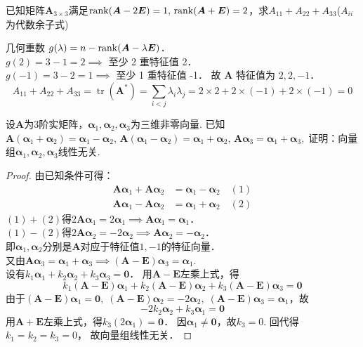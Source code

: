 \documentclass[12pt, a4paper, oneside, UTF8]{ctexbook}
\begin{document}
\begin{example}
    已知矩阵$\bm{A}_{3 \times 3}$满足$\mathrm{rank}(\bm{A}-2\bm{E})=1,\,\mathrm{rank}(\bm{A}+\bm{E})=2$，求$A_{11}+A_{22}+A_{33}$\;($A_{ii}$为代数余子式)
\end{example}
\begin{solution}
几何重数 $g(\lambda) = n - \mathrm{rank}(\bm{A}-\lambda\bm{E})$．\\
$g(2) = 3 - 1 = 2 \implies$ 至少 2 重特征值 2．\\
$g(-1) = 3 - 2 = 1 \implies$ 至少 1 重特征值 -1．
故 $\bm{A}$ 特征值为 $2, 2, -1$．
\[ A_{11}+A_{22}+A_{33} = \operatorname{tr}(\bm{A}^*) = \sum_{i<j} \lambda_i\lambda_j = 2\times 2 + 2\times(-1) + 2\times(-1) = 0 \]
\end{solution}

\begin{example}
    设$\bm{A}$为$3$阶实矩阵，$\bm{\alpha}_1,\bm{\alpha}_2,\bm{\alpha}_3$为三维非零向量. 已知$\bm{A}(\bm{\alpha}_1+\bm{\alpha}_2) = \bm{\alpha}_1-\bm{\alpha}_2,\, \bm{A}(\bm{\alpha}_1-\bm{\alpha}_2) = \bm{\alpha}_1+\bm{\alpha}_2,\, \bm{A}\bm{\alpha}_3 = \bm{\alpha}_1+\bm{\alpha}_3,\;$证明：向量组$\bm{\alpha}_1,\bm{\alpha}_2,\bm{\alpha}_3$线性无关.
\end{example}
\begin{proof}
    由已知条件可得：
    \begin{align*}
        \bm{A}\bm{\alpha}_1 + \bm{A}\bm{\alpha}_2 &= \bm{\alpha}_1 - \bm{\alpha}_2 \quad (1) \\
        \bm{A}\bm{\alpha}_1 - \bm{A}\bm{\alpha}_2 &= \bm{\alpha}_1 + \bm{\alpha}_2 \quad (2)
    \end{align*}
    $(1)+(2)$得$2\bm{A}\bm{\alpha}_1 = 2\bm{\alpha}_1 \implies \bm{A}\bm{\alpha}_1 = \bm{\alpha}_1$．\\
    $(1)-(2)$得$2\bm{A}\bm{\alpha}_2 = -2\bm{\alpha}_2 \implies \bm{A}\bm{\alpha}_2 = -\bm{\alpha}_2$．\\
    即$\bm{\alpha}_1,\bm{\alpha}_2$分别是$\bm{A}$对应于特征值$1,-1$的特征向量．\\
    又由$\bm{A}\bm{\alpha}_3 = \bm{\alpha}_1+\bm{\alpha}_3 \implies (\bm{A}-\bm{E})\bm{\alpha}_3 = \bm{\alpha}_1$.\\
    设有$k_1\bm{\alpha}_1+k_2\bm{\alpha}_2+k_3\bm{\alpha}_3=\bm{0}$．
    用$\bm{A}-\bm{E}$左乘上式，得
    \[ k_1(\bm{A}-\bm{E})\bm{\alpha}_1 + k_2(\bm{A}-\bm{E})\bm{\alpha}_2 + k_3(\bm{A}-\bm{E})\bm{\alpha}_3 = \bm{0} \]
    由于$(\bm{A}-\bm{E})\bm{\alpha}_1 = \bm{0},\;(\bm{A}-\bm{E})\bm{\alpha}_2 = -2\bm{\alpha}_2,\;(\bm{A}-\bm{E})\bm{\alpha}_3 = \bm{\alpha}_1$，故
    \[ -2k_2\bm{\alpha}_2 + k_3\bm{\alpha}_1 = \bm{0} \]
    用$\bm{A}+\bm{E}$左乘上式，得$k_3(2\bm{\alpha}_1) = \bm{0}$．
    因$\bm{\alpha}_1 \neq \bm{0}$，故$k_3=0$. 回代得$k_1=k_2=k_3=0$，
    故向量组线性无关．
\end{proof}
\end{document}
